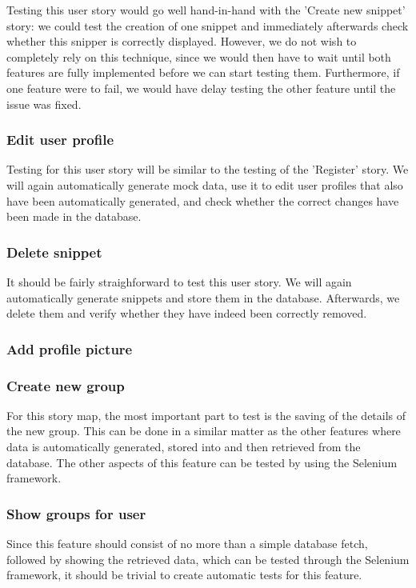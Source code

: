 \documentclass[10pt,a4paper,BCOR12mm, headexclude, footexclude,
  twoside, openright]{scrartcl}
\numberwithin{equation}{section} %
\numberwithin{figure}{section} %
\numberwithin{table}{section} %
\begin{document}
Testing this user story would go well hand-in-hand with the 'Create new snippet'
story: we could test the creation of one snippet and immediately afterwards
check whether this snipper is correctly displayed.  However, we do not wish to
completely rely on this technique, since we would then have to wait until both
features are fully implemented before we can start testing them. Furthermore, if
one feature were to fail, we would have delay testing the other feature until
the issue was fixed.

\subsubsection*{Edit user profile}
Testing for this user story will be similar to the testing of the 'Register'
story. We will again automatically generate mock data, use it to edit user
profiles that also have been automatically generated, and check whether the
correct changes have been made in the database.

\subsubsection*{Delete snippet}
It should be fairly straighforward to test this user story. We will again
automatically generate snippets and store them in the database. Afterwards, we
delete them and verify whether they have indeed been correctly removed.

\subsubsection*{Add profile picture}

\subsubsection*{Create new group}
For this story map, the most important part to test is the saving of the details
of the new group. This can be done in a similar matter as the other features
where data is automatically generated, stored into and then retrieved from the
database.  The other aspects of this feature can be tested by using the Selenium
framework.

\subsubsection*{Show groups for user}
Since this feature should consist of no more than a simple database fetch,
followed by showing the retrieved data, which can be tested through the Selenium
framework, it should be trivial to create automatic tests for this feature.
\end{document}

